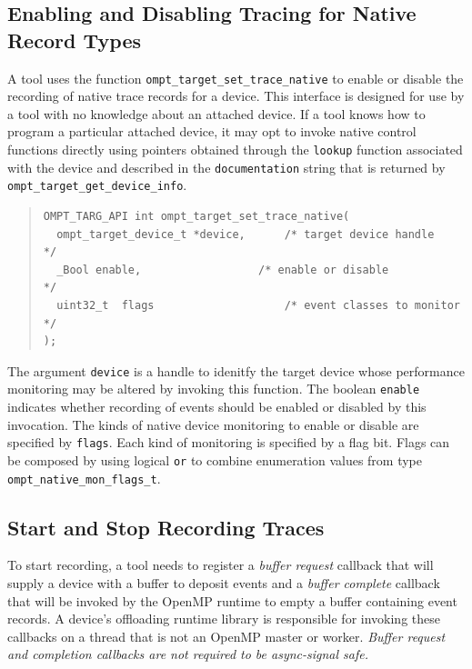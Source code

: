 \documentclass{article}
\begin{document}
\subsection{Enabling and Disabling Tracing for Native Record Types}
\label{sec:trace-event-native}
A tool uses the function \verb|ompt_target_set_trace_native| to enable or disable the recording of native trace records for a device. This interface is designed for use by a tool with no 
knowledge about an attached device. If a tool knows how to program a particular attached device, it may opt to invoke native control functions directly using pointers obtained through the \verb|lookup| function associated with the device and described in the \verb|documentation| string that is returned by \verb|ompt_target_get_device_info|.

\begin{quote}
\begin{verbatim}
OMPT_TARG_API int ompt_target_set_trace_native(
  ompt_target_device_t *device,      /* target device handle            */
  _Bool enable,                  /* enable or disable               */
  uint32_t  flags                    /* event classes to monitor        */
);
\end{verbatim}
\end{quote}
The argument \verb|device| is a handle to idenitfy the target device whose performance monitoring may be altered by invoking this function. 
The boolean \verb|enable| indicates whether recording of events should be enabled or disabled by this invocation.
The kinds of native device monitoring to enable or disable are specified by \verb|flags|. Each kind of monitoring is specified by a flag bit. Flags can be composed by using logical {\tt or}  to combine enumeration values from type \verb|ompt_native_mon_flags_t|.

\subsection{Start and Stop Recording Traces}
\label{sec:start-stop-recording}

To start recording, a tool needs to register a \emph{buffer request} callback that will supply a device with a buffer to deposit events and a \emph{buffer complete} callback that will be invoked by the OpenMP runtime to empty a buffer containing event records. A device's offloading runtime library is responsible for invoking these callbacks on a thread that is not an OpenMP master or worker. {\em Buffer request and completion callbacks are not required to  be async-signal safe.}
\end{document}
